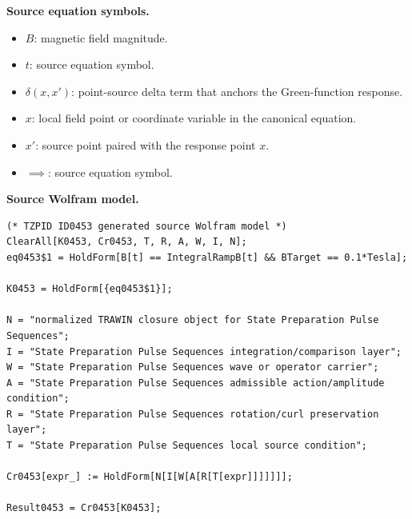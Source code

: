 \begin{minipage}[t]{0.49\linewidth}
\begingroup
\small
\raggedright
\textbf{Source equation symbols.}\par
\begin{itemize}[leftmargin=1.35em,itemsep=1pt,topsep=1pt,parsep=0pt]
    \item $B$: magnetic field magnitude.
    \item $t$: source equation symbol.
    \item $\delta(x,x')$: point-source delta term that anchors the Green-function response.
    \item $x$: local field point or coordinate variable in the canonical equation.
    \item $x'$: source point paired with the response point $x$.
    \item $\implies$: source equation symbol.
\end{itemize}
\endgroup
\end{minipage}\hfill
\begin{minipage}[t]{0.47\linewidth}
\begingroup
\scriptsize
\raggedright
\textbf{Source Wolfram model.}\par
\begin{Verbatim}[fontsize=\tiny,breaklines=true,breakanywhere=true]
(* TZPID ID0453 generated source Wolfram model *)
ClearAll[K0453, Cr0453, T, R, A, W, I, N];
eq0453$1 = HoldForm[B[t] == IntegralRampB[t] && BTarget == 0.1*Tesla];

K0453 = HoldForm[{eq0453$1}];

N = "normalized TRAWIN closure object for State Preparation Pulse Sequences";
I = "State Preparation Pulse Sequences integration/comparison layer";
W = "State Preparation Pulse Sequences wave or operator carrier";
A = "State Preparation Pulse Sequences admissible action/amplitude condition";
R = "State Preparation Pulse Sequences rotation/curl preservation layer";
T = "State Preparation Pulse Sequences local source condition";

Cr0453[expr_] := HoldForm[N[I[W[A[R[T[expr]]]]]]];

Result0453 = Cr0453[K0453];
\end{Verbatim}
\endgroup
\end{minipage}


